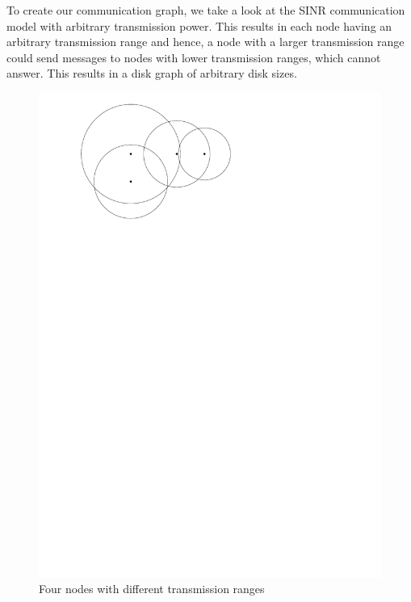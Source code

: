 To create our communication graph, we take a look at the SINR communication model with arbitrary transmission power. This results in each node having an arbitrary transmission range and hence, a node with a larger transmission range could send messages to nodes with lower transmission ranges, which cannot answer. This results in a disk graph of arbitrary disk sizes.

\begin{figure}[ht]
\center
\includegraphics[scale=0.7]{figures/transmissionrange.pdf}
\caption{Four nodes with different transmission ranges\label{figure:tr}}
\end{figure}
